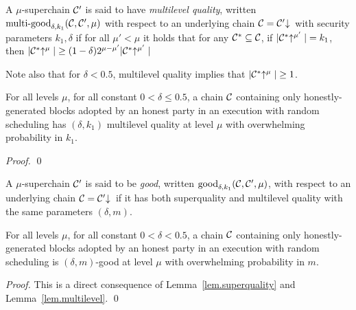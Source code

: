 \begin{definition}
A $\mu$-superchain $\mathcal{C}'$ is said to have \textit{multilevel quality}, written
$\textnormal{multi-good}_{\delta, k_1}(\mathcal{C}, \mathcal{C}', \mu)$ with respect to an
underlying chain $\mathcal{C} = \mathcal{C}'\negthickspace\downarrow\,$ with security parameters $k_1,
\delta$ if for all $\mu' < \mu$ it holds that for any $\mathcal{C}^* \subseteq \mathcal{C}$,
if $|\mathcal{C}^*\negthickspace\uparrow^{\mu'}| = k_1$, then $|\mathcal{C}^*\negthickspace\uparrow^{\mu}| \geq (1 -
\delta)2^{\mu - \mu'}|\mathcal{C}^*\negthickspace\uparrow^{\mu'}|$
\end{definition}

Note also that for $\delta < 0.5$, multilevel quality implies that
$|\mathcal{C}^*\negthickspace\uparrow^{\mu}| \geq 1$.

\begin{lemma}\label{lem.multilevel}
For all levels $\mu$, for all constant $0 < \delta \leq 0.5$, a chain $\mathcal{C}$
containing only honestly-generated blocks adopted by an honest party in an
execution with random scheduling has $(\delta, k_1)$ multilevel quality at level
$\mu$ with overwhelming probability in $k_1$.
\end{lemma}
\begin{proof}
\qed
\end{proof}

\begin{definition}\label{lem.good}
A $\mu$-superchain $\mathcal{C}'$ is said to be \textit{good}, written
$\textnormal{good}_{\delta, k_1}(\mathcal{C}, \mathcal{C}', \mu)$, with respect to an
underlying chain $\mathcal{C} = \mathcal{C}'\negthickspace\downarrow\,$ if it has both superquality and multilevel quality with the same parameters $(\delta, m)$.
\end{definition}

\begin{corollary}
\label{crly.superchain-distribution}
For all levels $\mu$, for all constant $0 < \delta < 0.5$, a chain
$\mathcal{C}$ containing only honestly-generated blocks adopted by an honest party in
an execution with random scheduling is $(\delta, m)$-good at level
$\mu$ with overwhelming probability in $m$.
\end{corollary}
\begin{proof}
This is a direct consequence of Lemma~\ref{lem.superquality} and
Lemma~\ref{lem.multilevel}. \qed
\end{proof}
